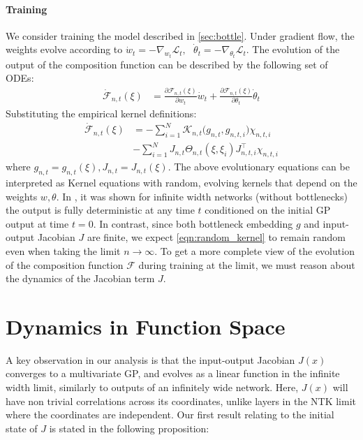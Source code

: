 \documentclass{article}
\theoremstyle{definition}
\theoremstyle{remark}
\renewcommand{\[}{\begin{eqnarray}}
\renewcommand{\]}{\end{eqnarray}}
\renewcommand{\[}{\begin{eqnarray}}
\renewcommand{\]}{\end{eqnarray}}
\newcommand{\F}{\mathcal{F}}
\begin{document}
\paragraph{Training} We consider training the model described in \cref{sec:bottle}. Under gradient flow, the weights evolve according to $\dot{w}_t = -\nabla_{w_t}\mathcal{L}_t,~~~\dot{\theta}_t = -\nabla_{\theta_t}\mathcal{L}_t$. The evolution of the output of the composition function can be described by the following set of ODEs:  
\begin{align}\label{eqn:gf}
\dot{\mathbf{\F}}_{n,t}(\xi) &= \frac{\partial \F_{n,t}(\xi)}{\partial w_t}\dot{w}_t + \frac{\partial \F_{n,t}(\xi)}{\partial \theta_t}\dot{\theta}_t
\end{align}
Substituting the empirical kernel definitions:
\begin{align}\label{eqn:random_kernel}
\dot{\F}_{n,t}(\xi) &= -\sum_{i=1}^N\mathcal{K}_{n,t}\big(g_{n,t},g_{n,t,i}\big)\chi_{n,t,i} \\\nonumber
&-\sum_{i=1}^NJ_{n,t} \Theta_{n,t}(\xi,\xi_i)J^{\top}_{n,t,i} \chi_{n,t,i}
\end{align}
where $g_{n,t} = g_{n,t}(\xi), J_{n,t} = J_{n,t}(\xi)$. The above evolutionary equations can be interpreted as Kernel equations with random, evolving kernels that depend on the weights $w,\theta$. In \cite{NTK}, it was shown for infinite width networks (without bottlenecks) the output is fully deterministic at any time $t$ conditioned on the initial GP output at time $t=0$. In contrast, since both bottleneck embedding $g$ and input-output Jacobian $J$ are finite, we expect \cref{eqn:random_kernel} to remain random even when taking the limit $n \to \infty$. To get a more complete view of the evolution of the composition function $\F$ during training at the limit, we must reason about the dynamics of the Jacobian term $J$. 


\section{Dynamics in Function Space} 
A key observation in our analysis is that the input-output Jacobian $J(x)$ converges to a multivariate GP, and evolves as a linear function in the infinite width limit, similarly to outputs of an infinitely wide network. Here, $J(x)$ will have non trivial correlations across its coordinates, unlike layers in the NTK limit where the coordinates are independent. Our first result relating to the initial state of $J$ is stated in the following proposition:
\end{document}
